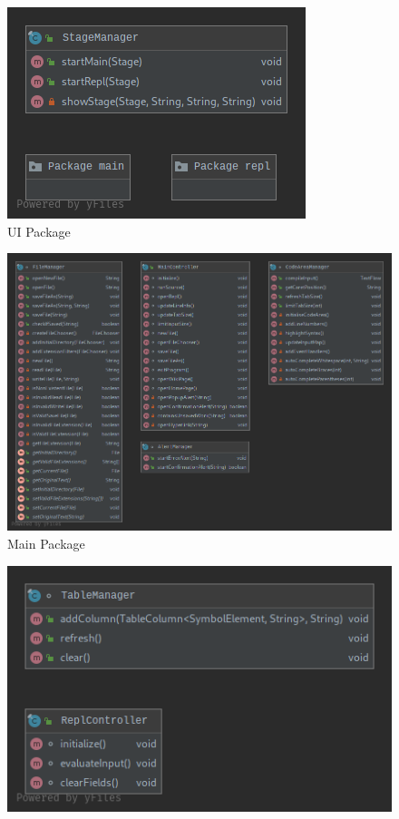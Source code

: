 \documentclass[
]{report}
\begin{document}
\begin{appendices}
\begin{figure}
	\end{figure}
	\begin{figure}
		\centering
		\includegraphics[width=\textwidth]{ui-package-diagram}
		\caption{UI Package}
		\label{fig:ui-package-diagram}
	\end{figure}
	\begin{figure}
		\centering
		\includegraphics[width=\textwidth]{main-package-diagram}
		\caption{Main Package}
		\label{fig:main-package-diagram}
	\end{figure}
	\begin{figure}
		\centering
		\includegraphics[width=\textwidth]{repl-package-diagram}

\end{figure}
\end{appendices}
\end{document}
